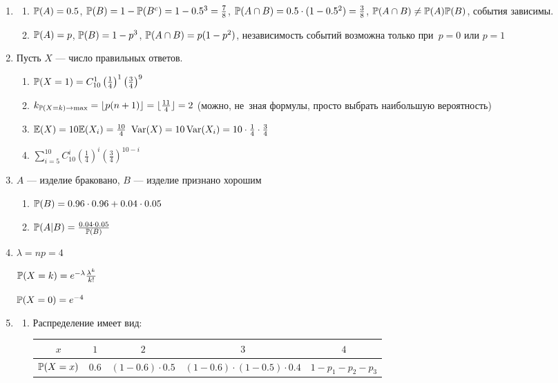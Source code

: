 \begin{enumerate}
\item
\begin{enumerate}
\item $\P(A)=0.5$, $\P(B)=1-\P(B^{c})=1-0.5^{3}=\frac{7}{8}$, $\P(A\cap
B)=0.5\cdot (1-0.5^{2})=\frac{3}{8}$, $\P(A\cap B)\neq \P(A)\P(B)$,
события зависимы.
\item $\P(A)=p$, $\P(B)=1-p^{3}$, $\P(A\cap B)=p(1-p^{2})$,
независимость событий возможна только при~$p=0$ или $p=1$
\end{enumerate}
\item  Пусть $X$ — число правильных ответов.
\begin{enumerate}
\item $\P(X=1)=C_{10}^{1}\left(\frac{1}{4}\right)^{1}\left(\frac{3}{4}\right)^{9}$
\item $k_{\P(X=k)\rightarrow \max}=\lfloor p(n+1)\rfloor=\lfloor
\frac{11}{4}\rfloor=2$ (можно, не~зная формулы, просто выбрать
наибольшую вероятность)
\item $\E(X)=10\E(X_{i})=\frac{10}{4}$
$\Var(X)=10\Var(X_{i})=10 \cdot \frac{1}{4} \cdot \frac{3}{4}$
\item $\sum_{i=5}^{10}C_{10}^{i}\left(\frac{1}{4}\right)^{i}\left(\frac{3}{4}\right)^{10-i}$
\end{enumerate}
\item $A$ — изделие браковано, $B$ — изделие признано хорошим
\begin{enumerate}
\item $\P(B)=0.96\cdot 0.96+0.04\cdot 0.05$
\item $\P(A|B)=\frac{0.04\cdot 0.05}{\P(B)}$
\end{enumerate}
\item  $\lambda=np=4$

$\P(X=k)=e^{-\lambda}\frac{\lambda^{k}}{k!}$

$\P(X=0)=e^{-4}$
\item
\begin{enumerate}
\item Распределение имеет вид:

\begin{tabular}{@{}ccccc@{}}
\toprule
$x$       & $1$   & $2$               & $3$                           & $4$             \\ \midrule
$\P(X=x)$ & $0.6$ & $(1-0.6)\cdot0.5$ & $(1-0.6)\cdot(1-0.5)\cdot0.4$ & $1-p_1-p_2-p_3$ \\ \bottomrule
\end{tabular}


\end{enumerate}
\end{enumerate}
